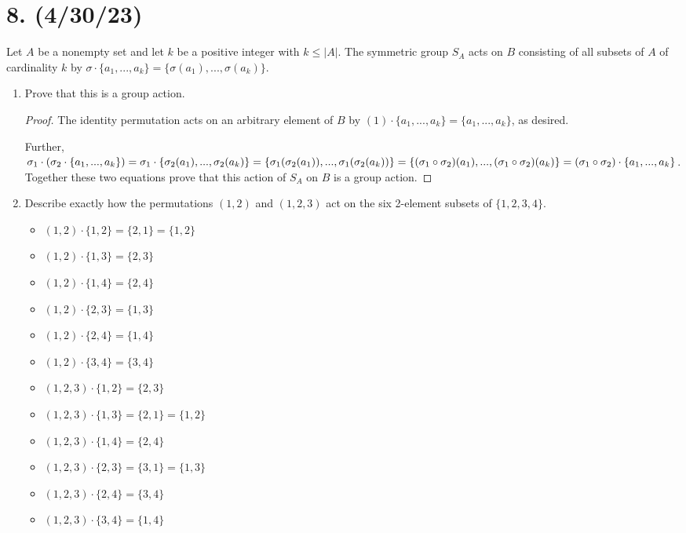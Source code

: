 \documentclass{article}
\begin{document}
\section*{8. (4/30/23)}

Let $A$ be a nonempty set and let $k$ be a positive integer with $k \leq |A|$. The symmetric group $S_A$ acts on $B$ consisting of all subsets of $A$ of cardinality $k$ by $\sigma \cdot \{ a_1, ..., a_k \} = \{ \sigma(a_1), ..., \sigma(a_k) \}$.

\begin{enumerate}[label=(\alph*)]
    \item Prove that this is a group action.
          \begin{proof}
            The identity permutation acts on an arbitrary element of $B$ by $(1) \cdot \{ a_1, ..., a_k \} = \{ a_1, ..., a_k \}$, as desired.

            Further, $\sigma_1 \cdot (\sigma_2 \cdot \{ a_1, ..., a_k \}) = \sigma_1 \cdot \{ \sigma_2(a_1), ..., \sigma_2(a_k) \} = \{ \sigma_1(\sigma_2(a_1)), ..., \\ \sigma_1(\sigma_2(a_k)) \} = \{ (\sigma_1 \circ \sigma_2)(a_1), ..., (\sigma_1 \circ \sigma_2)(a_k) \} = (\sigma_1 \circ \sigma_2) \cdot \{ a_1, ..., a_k \}$. Together these two equations prove that this action of $S_A$ on $B$ is a group action.
          \end{proof}
    \item Describe exactly how the permutations $(1, 2)$ and $(1, 2, 3)$ act on the six 2-element subsets of $\{1, 2, 3, 4\}$.
          \begin{itemize}
            \item $(1, 2) \cdot \{1, 2\} = \{2, 1\} = \{1, 2\}$
            \item $(1, 2) \cdot \{1, 3\} = \{2, 3\}$
            \item $(1, 2) \cdot \{1, 4\} = \{2, 4\}$
            \item $(1, 2) \cdot \{2, 3\} = \{1, 3\}$
            \item $(1, 2) \cdot \{2, 4\} = \{1, 4\}$
            \item $(1, 2) \cdot \{3, 4\} = \{3, 4\}$
            \item $(1, 2, 3) \cdot \{1, 2\} = \{2, 3\}$
            \item $(1, 2, 3) \cdot \{1, 3\} = \{2, 1\} = \{1, 2\}$
            \item $(1, 2, 3) \cdot \{1, 4\} = \{2, 4\}$
            \item $(1, 2, 3) \cdot \{2, 3\} = \{3, 1\} = \{1, 3\}$
            \item $(1, 2, 3) \cdot \{2, 4\} = \{3, 4\}$
            \item $(1, 2, 3) \cdot \{3, 4\} = \{1, 4\}$
          \end{itemize}
\end{enumerate}
\end{document}
